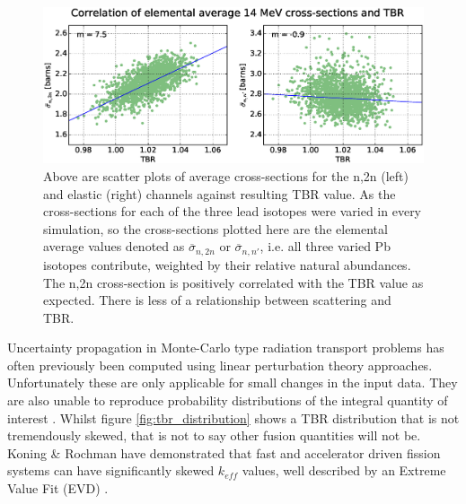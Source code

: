 \begin{figure}[H]
  \centering
	\includegraphics[width=\textwidth]{pb_tbr_n2n_el_corr}
	\caption{Above are scatter plots of average cross-sections for the n,2n (left) and elastic (right) channels against resulting TBR value. As the cross-sections for each of the three lead isotopes were varied in every simulation, so the cross-sections plotted here are the elemental average values denoted as $\overline{\sigma}_{n,2n}$ or $\overline{\sigma}_{n,n'}$, i.e. all three varied Pb isotopes contribute, weighted by their relative natural abundances. The n,2n cross-section is positively correlated with the TBR value as expected. There is less of a relationship between scattering and TBR.}
	\label{fig:tbr_n2n}
\end{figure}




Uncertainty propagation in Monte-Carlo type radiation transport problems has often previously been computed using linear perturbation theory approaches. Unfortunately these are only applicable for small changes in the input data. They are also unable to reproduce probability distributions of the integral quantity of interest \cite{Rising2012}. Whilst figure \ref{fig:tbr_distribution} shows a TBR distribution that is not tremendously skewed, that is not to say other fusion quantities will not be. Koning \& Rochman have demonstrated that fast and accelerator driven fission systems can have significantly skewed $k_{eff}$ values, well described by an Extreme Value Fit (EVD) \cite{Koning2008}.

